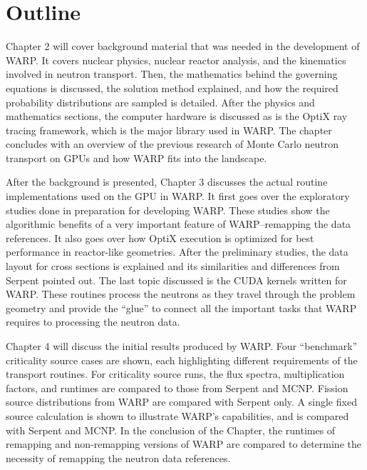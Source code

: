\section{Outline}

Chapter 2 will cover background material that was needed in the development of WARP.  It covers nuclear physics, nuclear reactor analysis, and the kinematics involved in neutron transport.  Then, the mathematics behind the governing equations is discussed, the solution method explained, and how the required probability distributions are sampled is detailed.  After the physics and mathematics sections, the computer hardware is discussed as is the OptiX ray tracing framework, which is the major library used in WARP.  The chapter concludes with an overview of the previous research of Monte Carlo neutron transport on GPUs and how WARP fits into the landscape.

After the background is presented, Chapter 3 discusses the actual routine implementations used on the GPU in WARP.  It first goes over the exploratory studies done in preparation for developing WARP.  These studies show the algorithmic benefits of a very important feature of WARP--remapping the data references.  It also goes over how OptiX execution is optimized for best performance in reactor-like geometries.  After the preliminary studies, the data layout for cross sections is explained and its similarities and differences from Serpent pointed out.  The last topic discussed is the CUDA kernels written for WARP.  These routines process the neutrons as they travel through the problem geometry and provide the ``glue'' to connect all the important tasks that WARP requires to processing the neutron data.

Chapter 4 will discuss the initial results produced by WARP.  Four ``benchmark'' criticality source cases are shown, each highlighting different requirements of the transport routines.  For criticality source runs, the flux spectra, multiplication factors, and runtimes are compared to those from Serpent and MCNP.  Fission source distributions from WARP are compared with Serpent only.  A single fixed source calculation is shown to illustrate WARP's capabilities, and is compared with Serpent and MCNP.  In the conclusion of the Chapter, the runtimes of remapping and non-remapping versions of WARP are compared to determine the necessity of remapping the neutron data references.

